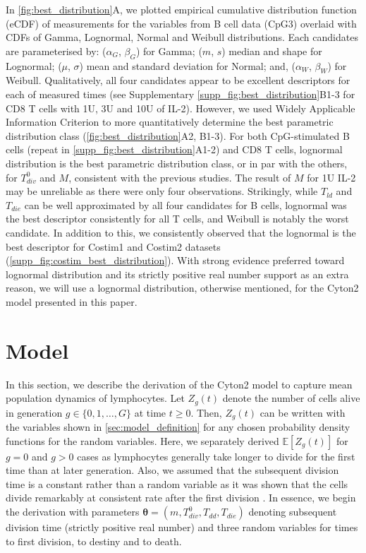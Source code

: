 \documentclass[11pt, a4paper]{article}
\begin{document}
In \cref{fig:best_distribution}A, we plotted empirical cumulative distribution function (eCDF) of measurements for the variables from B cell data (CpG3) overlaid with CDFs of Gamma, Lognormal, Normal and Weibull distributions. Each candidates are parameterised by: ($\alpha_G$, $\beta_G$) for Gamma; ($m$, $s$) median and shape for Lognormal; ($\mu$, $\sigma$) mean and standard deviation for Normal; and, ($\alpha_W$, $\beta_W$) for Weibull. Qualitatively, all four candidates appear to be excellent descriptors for each of measured times (see Supplementary \cref{supp_fig:best_distribution}B1-3 for CD8 T cells with 1U, 3U and 10U of IL-2). However, we used Widely Applicable Information Criterion \parencite{Watanabe.2010} to more quantitatively determine the best parametric distribution class (\cref{fig:best_distribution}A2, B1-3). For both CpG-stimulated B cells (repeat in \cref{supp_fig:best_distribution}A1-2) and CD8 T cells, lognormal distribution is the best parametric distribution class, or in par with the others, for $T_{div}^0$ and $M$, consistent with the previous studies. The result of $M$ for 1U IL-2 may be unreliable as there were only four observations. Strikingly, while $T_{ld}$ and $T_{die}$ can be well approximated by all four candidates for B cells, lognormal was the best descriptor consistently for all T cells, and Weibull is notably the worst candidate. In addition to this, we consistently observed that the lognormal is the best descriptor for Costim1 and Costim2 datasets (\cref{supp_fig:costim_best_distribution}). With strong evidence preferred toward lognormal distribution and its strictly positive real number support as an extra reason, we will use a lognormal distribution, otherwise mentioned, for the Cyton2 model presented in this paper.

\nolinenumbers
\section{Model}
\noindent
In this section, we describe the derivation of the Cyton2 model to capture mean population dynamics of lymphocytes. Let $Z_g(t)$ denote the number of cells alive in generation $g \in \{0,1,\dots,G\}$ at time $t \geq 0$. Then, $Z_g(t)$ can be written with the variables shown in \cref{sec:model_definition} for any chosen probability density functions for the random variables. Here, we separately derived $\mathbb{E}[Z_g(t)]$ for $g=0$ and $g>0$ cases as lymphocytes generally take longer to divide for the first time than at later generation. Also, we assumed that the subsequent division time is a constant rather than a random variable as it was shown that the cells divide remarkably at consistent rate after the first division \parencite{Gett.2000, Gett.1998}. In essence, we begin the derivation with parameters $\boldsymbol{\theta} = (m, T_{div}^0, T_{dd}, T_{die})$ denoting subsequent division time (strictly positive real number) and three random variables for times to first division, to destiny and to death.
\end{document}
